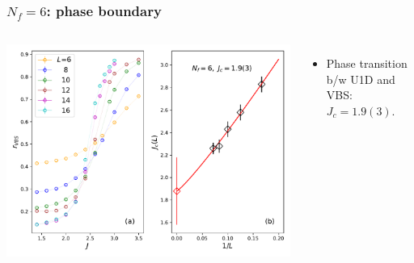 \documentclass[xcolor=table, 10pt, aspectratio=169]{beamer}
\begin{document}
\begin{frame}
  \frametitle{$N_f=6$: phase boundary}
  \begin{columns}
    \includegraphics[width=\textwidth]{n6rvbs}
		\begin{itemize}
			\item Phase transition b/w U1D and VBS: $J_c=1.9(3)$.
		\end{itemize}
  \end{columns}
\end{frame}
\end{document}
